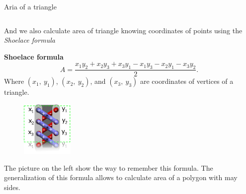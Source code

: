 \documentclass[9pt,aspectratio=169]{beamer}
\begin{document}
\begin{frame}{Aria of a triangle}
\begin{columns}[T]
\begin{column}{0.5\textwidth}
      And we also calculate area of triangle knowing coordinates of points using the \emph{Shoelace formula}
      \begin{definition}
        \textbf{Shoelace formula} 
        \[A = \frac{x_1 y_2 + x_2 y_3 + x_3 y_1 - x_1 y_3 - x_2 y_1 - x_3 y_2}{2}. \] Where $(x_1,\ y_1)$, $(x_2,\ y_2)$, and $(x_3,\ y_3)$ are coordinates of vertices of a triangle.
      \end{definition}
      \begin{figure}
        \vspace*{-\intextsep}
        \includegraphics[width=2.5cm]{12 - Right Triangles/Shoelace3.png}
        \vspace*{-\intextsep}
      \end{figure}
      The picture on the left show the way to remember this formula. The generalization of this formula allows to calculate area of a polygon with may sides.
    \end{column}
  \end{columns}
\end{frame}

\end{document}
